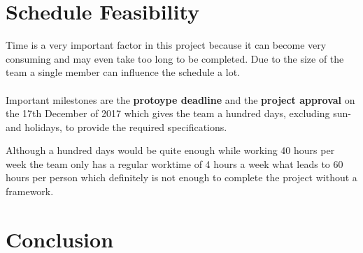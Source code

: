 \documentclass[11pt]{article}
\begin{document}
\section{Schedule Feasibility}
Time is a very important factor in this project because it can become very consuming and may even take too long to be completed.
Due to the size of the team a single member can influence the schedule a lot.
\\
\\
Important milestones are the \textbf{protoype deadline} and the \textbf{project approval} on the 17th December of 2017 which gives the team a hundred days, excluding sun- and holidays, to provide the required specifications.

Although a hundred days would be quite enough while working 40 hours per week the team only has a regular worktime of 4 hours a week what leads to 60 hours per person which definitely is not enough to complete the project without a framework.

\section{Conclusion}
\end{document}
